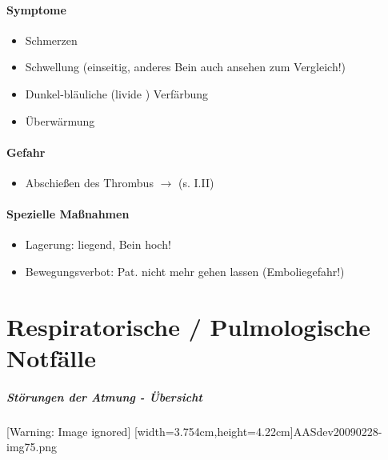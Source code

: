 \paragraph{Symptome}

\begin{itemize}
    \item Schmerzen
    \item Schwellung (einseitig, anderes Bein auch ansehen zum Vergleich!)
    \item Dunkel-bläuliche (livide ) Verfärbung
    \item Überwärmung    
\end{itemize}

\paragraph{Gefahr}

\begin{itemize}
    \item Abschie{\ss}en des Thrombus ${\rightarrow}$
     (s.
    I.II{\guillemotright}\pageref{bkm:RefHeading37612625})
\end{itemize}

\begin{gMassnahmenEnv}
    
    \paragraph{Spezielle Ma{\ss}nahmen}
    
    \begin{itemize}
        \item Lagerung:  liegend, Bein hoch!
        \item Bewegungsverbot: Pat. nicht mehr gehen lassen  (Emboliegefahr!)
    \end{itemize}
    
\end{gMassnahmenEnv}

\section{Respiratorische / Pulmologische  Notfälle}
\subparagraph{Störungen der Atmung - Übersicht}

\begin{center}
 [Warning: Image ignored] [width=3.754cm,height=4.22cm]{AASdev20090228-img75.png}
\end{center}

